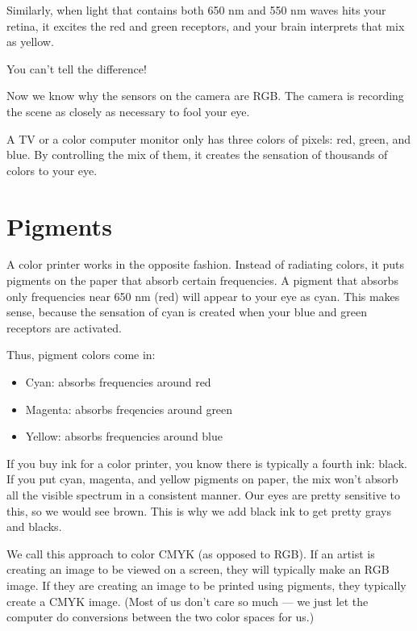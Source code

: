 Similarly, when light that contains both 650 nm and 550 nm waves hits
your retina, it excites the red and green receptors, and your brain
interprets that mix as yellow.

You can't tell the difference!

Now we know why the sensors on the camera are RGB. The camera is
recording the scene as closely as necessary to fool your eye.

A TV or a color computer monitor only has three colors of pixels: red,
green, and blue.  By controlling the mix of them, it creates the
sensation of thousands of colors to your eye.
\section{Pigments}

A color printer works in the opposite fashion. Instead of radiating
colors, it puts pigments on the paper that absorb certain frequencies.
A pigment that absorbs only frequencies near 650 nm (red) will appear
to your eye as cyan. This makes sense, because the sensation of cyan is
created when your blue and green receptors are activated.

Thus, pigment colors come in:
\begin{itemize}
\item Cyan: absorbs frequencies around red
\item Magenta: absorbs freqencies around green
\item Yellow: absorbs frequencies around blue
\end{itemize}

If you buy ink for a color printer, you know there is typically a
fourth ink: black. If you put cyan, magenta, and yellow pigments on
paper, the mix won't absorb all the visible spectrum in a consistent
manner. Our eyes are pretty sensitive to this, so we would see
brown. This is why we add black ink to get pretty grays and blacks.

We call this approach to color CMYK (as opposed to RGB). If an artist
is creating an image to be viewed on a screen, they will typically
make an RGB image.  If they are creating an image to be printed using
pigments, they typically create a CMYK image. (Most of us don't care
so much --- we just let the computer do conversions between the two
color spaces for us.)

